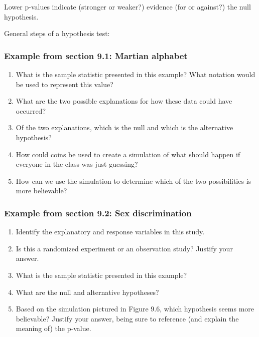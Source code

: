 \documentclass[
]{report}
\newcommand{\rgs}{\vspace{12pt}} %
\begin{document}
Lower p-values indicate (stronger or weaker?) evidence (for or against?) the null hypothesis.
\rgs

General steps of a hypothesis test:
\rgs

\hypertarget{example-from-section-9.1-martian-alphabet}{%
\subsubsection*{Example from section 9.1: Martian alphabet}\label{example-from-section-9.1-martian-alphabet}}

\begin{enumerate}
\def\labelenumi{\arabic{enumi}.}
\item
  What is the sample statistic presented in this example? What notation would be used to represent this value?
  \rgs
\item
  What are the two possible explanations for how these data could have occurred?
  \rgs
  \rgs
\item
  Of the two explanations, which is the null and which is the alternative hypothesis?
  \rgs
\item
  How could coins be used to create a simulation of what should happen if everyone in the class was just guessing?
  \rgs
  \rgs
  \rgs
\item
  How can we use the simulation to determine which of the two possibilities is more believable?
  \rgs
  \rgs
\end{enumerate}

\hypertarget{example-from-section-9.2-sex-discrimination}{%
\subsubsection*{Example from section 9.2: Sex discrimination}\label{example-from-section-9.2-sex-discrimination}}

\begin{enumerate}
\def\labelenumi{\arabic{enumi}.}
\item
  Identify the explanatory and response variables in this study.
  \rgs
\item
  Is this a randomized experiment or an observation study? Justify your answer.
  \rgs
\item
  What is the sample statistic presented in this example?\\
  \rgs
\item
  What are the null and alternative hypotheses?
  \rgs
  \rgs
\item
  Based on the simulation pictured in Figure 9.6, which hypothesis seems more believable? Justify your answer, being sure to reference (and explain the meaning of) the p-value.
  \rgs
  \rgs
\end{enumerate}
\end{document}
